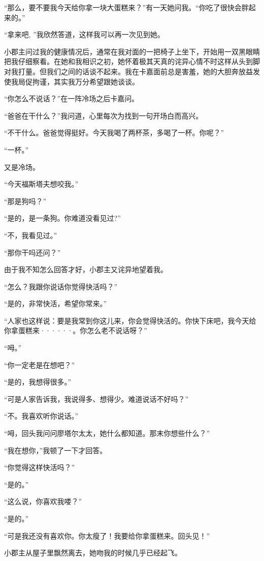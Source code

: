 \documentclass[12pt, UTF8]{ctexbook}
\begin{document}
\par “那么，要不要我今天给你拿一块大蛋糕来？”有一天她问我。“你吃了很快会胖起来的。”
\par “拿来吧, ”我欣然答道，这样我可以再一次见到她。
\par 小郡主问过我的健康情况后，通常在我对面的一把椅子上坐下，开始用一双黑眼睛把我仔细察看。在她和我相识之初，她怀着极其天真的诧异心情不时这样从头到脚对我打量。但我们之间的话谈不起来。我在卡嘉面前总是害羞，她的大胆奔放益发使我局促拘谨，其实我万分希望跟她谈谈。
\par “你怎么不说话？”在一阵冷场之后卡嘉问。
\par “爸爸在干什么？”我问道，心里每次为找到一句开场白而高兴。
\par “不干什么。爸爸觉得挺好。今天我喝了两杯茶，多喝了一杯。你呢？”
\par “一杯。”
\par 又是冷场。
\par “今天福斯塔夫想咬我。”
\par “那是狗吗？”
\par “是的，是一条狗。你难道没看见过?”
\par “不，我看见过。”
\par “那你干吗还问？”
\par 由于我不知怎么回答才好，小郡主又诧异地望着我。
\par “怎么？我跟你说话你觉得快活吗？”
\par “是的，非常快活，希望你常来。”
\par “人家也这样说：要是我常到你这儿来，你会觉得快活的。你快下床吧，我今天给你拿蛋糕来······。你怎么老不说话呀？”
\par “呣。”
\par “你一定老是在想吧？”
\par “是的，我想得很多。”
\par “可是人家告诉我，我说得多、想得少。难道说话不好吗？”
\par “不。我喜欢听你说话。”
\par “呣，回头我问问廖塔尔太太，她什么都知道。那末你想些什么？”
\par “我在想你，”我顿了一下才回答。
\par “你觉得这样快活吗？”
\par “是的。”
\par “这么说，你喜欢我喽？”
\par “是的。”
\par “可是我还没有喜欢你。你太瘦了！我要给你拿蛋糕来。回头见！”
\par 小郡主从屋子里飘然离去，她吻我的时候几乎已经起飞。
\end{document}
